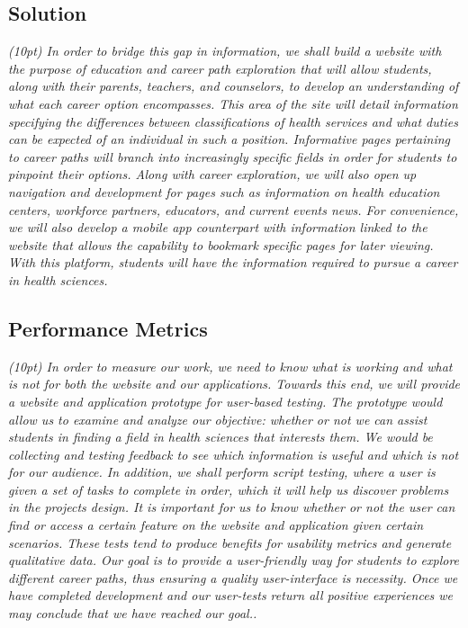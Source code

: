 \documentclass[letterpaper,10pt]{article}
\begin{document}
{\subsection[Solution]{\rmfamily\bfseries\color{black}
Solution}
{\itshape\color{black}\normalsize(10pt)
In order to bridge this gap in information, we shall build a website with the purpose of education and career path exploration that will allow students, along with their parents, teachers, and counselors, to develop an understanding of what each career option encompasses. This area of the site will detail information specifying the differences between classifications of health services and what duties can be expected of an individual in such a position. Informative pages pertaining to career paths will branch into increasingly specific fields in order for students to pinpoint their options. Along with career exploration, we will also open up navigation and development for pages such as information on health education centers, workforce partners, educators, and current events news. For convenience, we will also develop a mobile app counterpart with information linked to the website that allows the capability to bookmark specific pages for later viewing. With this platform, students will have the information required to pursue a career in health sciences.}

\subsection[Performance Metrics]{\rmfamily\bfseries\color{black}
Performance Metrics}
{\itshape\color{black}\normalsize(10pt)
In order to measure our work, we need to know what is working and what is not for both the website and our applications. Towards this end, we will provide a website and application prototype for user-based testing. The prototype would allow us to examine and analyze our objective: whether or not we can assist students in finding a field in health sciences that interests them. We would be collecting and testing feedback to see which information is useful and which is not for our audience. In addition, we shall perform script testing, where a user is given a set of tasks to complete in order, which it will help us discover problems in the projects design. It is important for us to know whether or not the user can find or access a certain feature on the website and application given certain scenarios. These tests tend to produce benefits for usability metrics and generate qualitative data. Our goal is to provide a user-friendly way for students to explore different career paths, thus ensuring a quality user-interface is necessity. Once we have completed development and our user-tests return all positive experiences we may conclude that we have reached our goal..}

}
\end{document}
